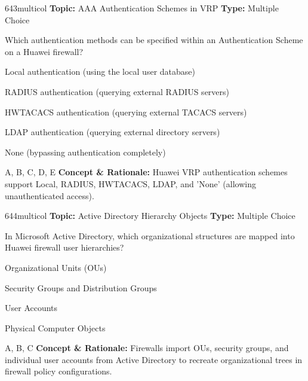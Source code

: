 \begin{qcard}{643}{multicol}
\textcolor{darkslate!75}{\small\textbf{Topic:} AAA Authentication Schemes in VRP \hfill \textbf{Type:} Multiple Choice}\vspace{0.4em}\par
Which authentication methods can be specified within an Authentication Scheme on a Huawei firewall?
\begin{qoptions}
\item Local authentication (using the local user database)
\item RADIUS authentication (querying external RADIUS servers)
\item HWTACACS authentication (querying external TACACS servers)
\item LDAP authentication (querying external directory servers)
\item None (bypassing authentication completely)
\end{qoptions}
\end{qcard}
\nopagebreak
\begin{explainbox}{A, B, C, D, E}
\textbf{Concept \& Rationale:} Huawei VRP authentication schemes support Local, RADIUS, HWTACACS, LDAP, and 'None' (allowing unauthenticated access).
\end{explainbox}

\begin{qcard}{644}{multicol}
\textcolor{darkslate!75}{\small\textbf{Topic:} Active Directory Hierarchy Objects \hfill \textbf{Type:} Multiple Choice}\vspace{0.4em}\par
In Microsoft Active Directory, which organizational structures are mapped into Huawei firewall user hierarchies?
\begin{qoptions}
\item Organizational Units (OUs)
\item Security Groups and Distribution Groups
\item User Accounts
\item Physical Computer Objects
\end{qoptions}
\end{qcard}
\nopagebreak
\begin{explainbox}{A, B, C}
\textbf{Concept \& Rationale:} Firewalls import OUs, security groups, and individual user accounts from Active Directory to recreate organizational trees in firewall policy configurations.
\end{explainbox}


